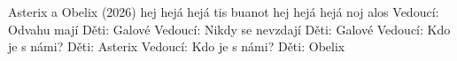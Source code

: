 \begin{TEXT}{Asterix a Obelix (2026)}
\SLOKA* {} hej hejá hejá\NL
{}tis buanot \NL
{} hej hejá hejá\NL
{}noj alos
\SLOKA* Vedoucí: Odvahu mají\NL
Děti: Galové\NL
Vedoucí: Nikdy se nevzdají\NL
Děti: Galové\NL
Vedoucí: Kdo je s námi?\NL
Děti: Asterix\NL
Vedoucí: Kdo je s námi?\NL
Děti: Obelix
\end{TEXT}

